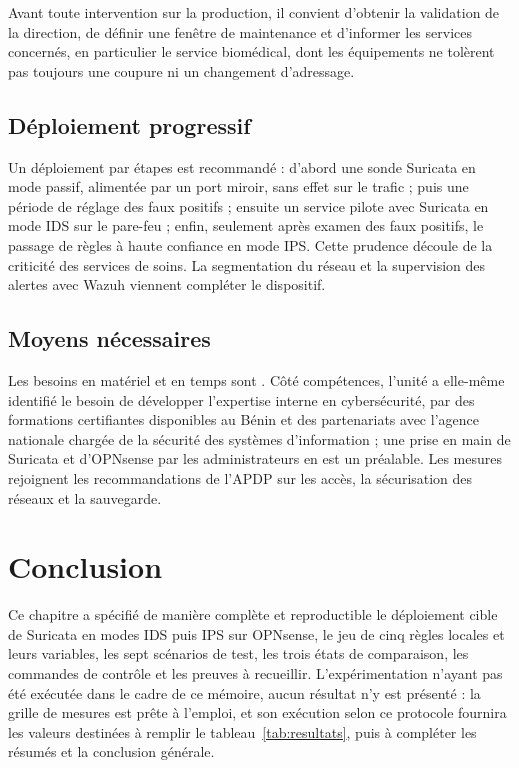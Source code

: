 Avant toute intervention sur la production, il convient d'obtenir la validation de la direction, de définir une fenêtre de maintenance et d'informer les services concernés, en particulier le service biomédical, dont les équipements ne tolèrent pas toujours une coupure ni un changement d'adressage.

\subsection{Déploiement progressif}

Un déploiement par étapes est recommandé : d'abord une sonde Suricata en mode passif, alimentée par un port miroir, sans effet sur le trafic ; puis une période de réglage des faux positifs ; ensuite un service pilote avec Suricata en mode IDS sur le pare-feu ; enfin, seulement après examen des faux positifs, le passage de règles à haute confiance en mode IPS. Cette prudence découle de la criticité des services de soins. La segmentation du réseau et la supervision des alertes avec Wazuh viennent compléter le dispositif.

\subsection{Moyens nécessaires}

Les besoins en matériel et en temps sont . Côté compétences, l'unité a elle-même identifié le besoin de développer l'expertise interne en cybersécurité, par des formations certifiantes disponibles au Bénin et des partenariats avec l'agence nationale chargée de la sécurité des systèmes d'information\cite{kaho2026} ; une prise en main de Suricata et d'OPNsense par les administrateurs en est un préalable. Les mesures rejoignent les recommandations de l'APDP sur les accès, la sécurisation des réseaux et la sauvegarde\cite{apdp2024}.

\section*{Conclusion}

Ce chapitre a spécifié de manière complète et reproductible le déploiement cible de Suricata en modes IDS puis IPS sur OPNsense, le jeu de cinq règles locales et leurs variables, les sept scénarios de test, les trois états de comparaison, les commandes de contrôle et les preuves à recueillir. L'expérimentation n'ayant pas été exécutée dans le cadre de ce mémoire, aucun résultat n'y est présenté : la grille de mesures est prête à l'emploi, et son exécution selon ce protocole fournira les valeurs destinées à remplir le tableau~\ref{tab:resultats}, puis à compléter les résumés et la conclusion générale.

